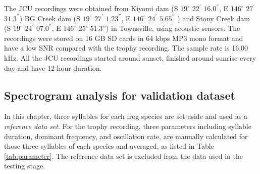 The JCU recordings were obtained from Kiyomi dam (S $19^{\circ}$ $22^{'}$ $16.0^{''}$, E $146^{\circ}$ $27^{'}$ $31.3^{''}$)  BG Creek dam (S $19^{\circ}$ $27^{'}$ $1.23^{''}$, E $146^{\circ}$ $24^{'}$ $5.65^{''}$ ) and Stony Creek dam (S $19^{\circ}$ $24^{'}$ $07.0^{''}$, E $146^{\circ}$ $25’$ $51.3”$) in Townsville, using acoustic sensors. The recordings were stored on 16 GB SD cards in 64 kbps MP3 mono format and have a low SNR compared with the trophy recording. The sample rate is 16.00 kHz.
All the JCU recordings started around sunset, finished around sunrise every day and have 12 hour duration. 






\subsection{Spectrogram analysis for validation dataset}
In this chapter, three syllables for each frog species are set aside and used as a \textit{reference data set}. For the trophy recording, three parameters including syllable duration, dominant frequency, and oscillation rate, are manually calculated for those three syllables of each species and averaged, as listed in Table \ref{tab:parameter}. The reference data set is excluded from the data used in the testing stage. 

